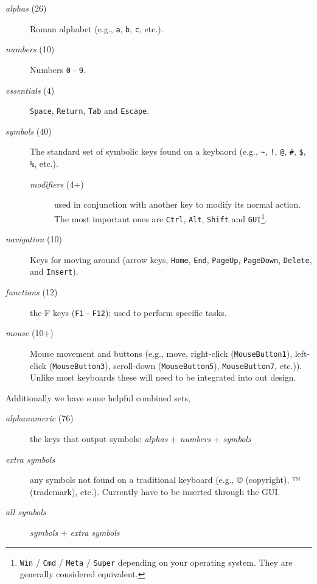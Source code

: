 \documentclass[logo,bsc,singlespacing,parskip]{infthesis}
\begin{document}
\begin{mdframed}
\begin{description}
\item[{\emph{alphas} (26)}] Roman alphabet (e.g., \texttt{a}, \texttt{b}, \texttt{c}, etc.).
\item[{\emph{numbers} (10)}] Numbers \texttt{0} - \texttt{9}.
\item[{\emph{essentials} (4)}] \texttt{Space}, \texttt{Return}, \texttt{Tab} and \texttt{Escape}.
\item[{\emph{symbols} (40)}] The standard set of symbolic keys found on a keybaord (e.g.,  \texttt{\textasciitilde{}}, \texttt{!}, \texttt{@}, \texttt{\#}, \texttt{\$}, \texttt{\%}, etc.).
\begin{description}
\item[{\emph{modifiers} (4+)}] used in conjunction with another key to modify its normal action. The most important ones are \texttt{Ctrl}, \texttt{Alt}, \texttt{Shift} and \texttt{GUI}\footnote{\texttt{Win} / \texttt{Cmd} / \texttt{Meta} / \texttt{Super} depending on your operating system. They are generally considered equivalent.}.
\end{description}
\item[{\emph{navigation} (10)}] Keys for moving around (arrow keys, \texttt{Home}, \texttt{End}, \texttt{PageUp}, \texttt{PageDown}, \texttt{Delete}, and \texttt{Insert}).
\item[{\emph{functions} (12)}] the F keys (\texttt{F1} - \texttt{F12}); used to perform specific tasks.
\item[{\emph{mouse} (10+)}] Mouse movement and buttons (e.g., move, right-click (\texttt{MouseButton1}), left-click (\texttt{MouseButton3}), scroll-down (\texttt{MouseButton5}), \texttt{MouseButton7}, etc.)).
Unlike most keyboards these will need to be integrated into out design.
\end{description}
Additionally we have some helpful combined sets,
\begin{description}
\item[{\emph{alphanumeric} (76)}] the keys that output symbols: \emph{alphas} + \emph{numbers} + \emph{symbols}
\item[{\emph{extra symbols} }] any symbols not found on a traditional keyboard (e.g., © (copyright), ™ (trademark), etc.).
Currently have to be inserted through the GUI.
\item[{\emph{all symbols}}] \emph{symbols} + \emph{extra symbols}
\end{description}
\end{mdframed}
\end{document}
